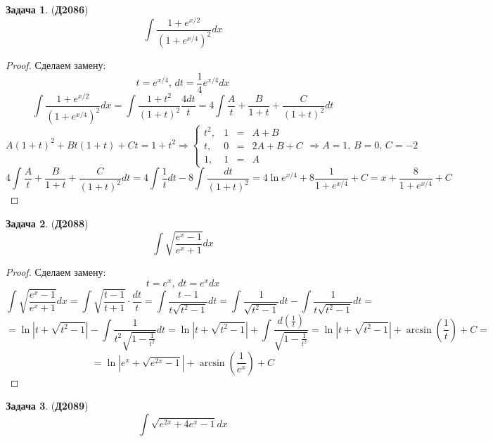 \documentclass[12pt]{article}
\theoremstyle{definition}
\newtheorem{problem}{Задача}
\DeclareMathOperator{\dint}{\displaystyle\int}
\begin{document}
\begin{problem}(\textbf{Д2086})
	$$
		\dint \dfrac{1 + e^{x/2}}{(1 + e^{x/4})^2}dx
	$$
\end{problem}
\begin{proof}
	Сделаем замену:
	$$
		t = e^{x/4}, \, dt = \dfrac{1}{4}e^{x/4}dx
	$$
	$$
		\dint \dfrac{1 + e^{x/2}}{(1 + e^{x/4})^2}dx = \dint \dfrac{1 + t^2}{(1 + t)^2}\dfrac{4dt}{t} = 4\dint \dfrac{A}{t} + \dfrac{B}{1 + t} + \dfrac{C}{(1 + t)^2}dt
	$$
	$$
		A(1 + t)^2 + Bt(1 + t) + Ct = 1 + t^2 \Rightarrow \left\{
			\begin{matrix}
				t^2, & 1 &=& A + B \\
				t, & 0 &=& 2A +B + C\\
				1, & 1 &=& A
			\end{matrix}
		\right. \Rightarrow A = 1, \, B = 0, \, C = -2
	$$
	$$
		4\dint \dfrac{A}{t} + \dfrac{B}{1 + t} + \dfrac{C}{(1 + t)^2}dt = 4\dint \dfrac{1}{t}dt - 8\dint \dfrac{dt}{(1 + t)^2} = 4\ln{e^{x/4}} + 8 \dfrac{1}{1 + e^{x/4}} + C = x + \dfrac{8}{1 + e^{x/4}} + C
	$$
\end{proof}
\newpage
\begin{problem}(\textbf{Д2088})
	$$
		\dint \sqrt{\dfrac{e^x  - 1}{e^x + 1}}dx
	$$
\end{problem}
\begin{proof}
	Сделаем замену:
	$$
		t = e^x, \, dt = e^x dx
	$$
	$$
		\dint \sqrt{\dfrac{e^x  - 1}{e^x + 1}}dx = \dint \sqrt{\dfrac{t - 1}{t + 1}}{\cdot}\dfrac{dt}{t} = \dint \dfrac{t-1}{t\sqrt{t^2 - 1}}dt = \dint \dfrac{1}{\sqrt{t^2 - 1}}dt - \dint\dfrac{1}{t\sqrt{t^2 - 1}}dt =
	$$
	$$
		=	\ln{|t + \sqrt{t^2 -1}|} - \dint \dfrac{1}{t^2\sqrt{1 - \tfrac{1}{t^2}}}dt = 	\ln{|t + \sqrt{t^2 -1}|} + \dint \dfrac{d \left(\tfrac{1}{t}\right)}{\sqrt{1 - \tfrac{1}{t^2}}} = \ln{|t + \sqrt{t^2 -1}|} + \arcsin{\left(\dfrac{1}{t}\right)} + C =
	$$
	$$
		=	\ln{|e^x + \sqrt{e^{2x} -1}|}+ \arcsin{\left(\dfrac{1}{e^x}\right)} + C
	$$
\end{proof}
\begin{problem}(\textbf{Д2089})
	$$
		\dint \sqrt{e^{2x} + 4e^x - 1}dx
	$$
\end{problem}
\end{document}
